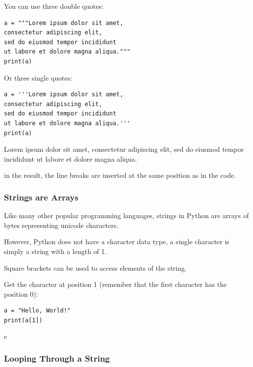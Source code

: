 \documentclass[12pt,a4paper]{article}
\begin{document}
\begin{ebox}
You can use three double quotes:

	\begin{lstlisting}
a = """Lorem ipsum dolor sit amet,
consectetur adipiscing elit,
sed do eiusmod tempor incididunt
ut labore et dolore magna aliqua."""
print(a)
	\end{lstlisting}

Or three single quotes:

	\begin{lstlisting}
a = '''Lorem ipsum dolor sit amet,
consectetur adipiscing elit,
sed do eiusmod tempor incididunt
ut labore et dolore magna aliqua.'''
print(a)
	\end{lstlisting}
\tcblower
	\begin{vercode}
Lorem ipsum dolor sit amet,
consectetur adipiscing elit,
sed do eiusmod tempor incididunt
ut labore et dolore magna aliqua.
	\end{vercode}
\end{ebox}

\begin{nbox}
in the result, the line breaks are inserted at the same position as in the
code.
\end{nbox}
\subsubsection{Strings are Arrays}
Like many other popular programming languages, strings in Python are arrays of
bytes representing unicode characters.

However, Python does not have a character data type, a single character is
simply a string with a length of 1.

Square brackets can be used to access elements of the string.

\begin{ebox}
Get the character at position 1 (remember that the first character has the position 0):

	\begin{lstlisting}
a = "Hello, World!"
print(a[1])
	\end{lstlisting}
\tcblower
	\begin{vercode}
e
	\end{vercode}
\end{ebox}
\subsubsection{Looping Through a String}
\end{document}
